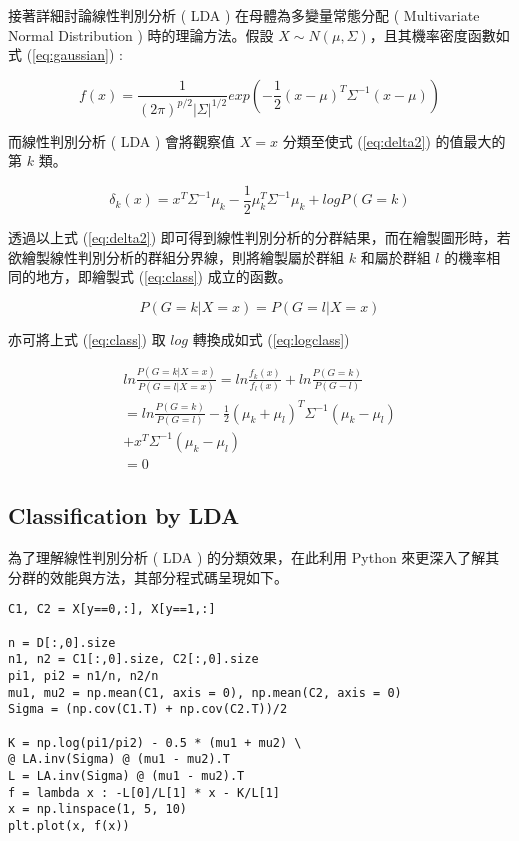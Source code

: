 接著詳細討論線性判別分析 ( LDA ) 在母體為多變量常態分配 ( Multivariate Normal Distribution ) 時的理論方法。假設 $X \sim N(\mu, \Sigma)$，且其機率密度函數如式 (\ref{eq:gaussian}) :

\begin{equation}\label{eq:gaussian}
f(x)=\frac{1}{(2\pi)^{p/2}\left|\Sigma\right|^{1/2}}exp(-\frac{1}{2}(x-\mu)^{T}\Sigma^{-1}(x-\mu))
\end{equation}

而線性判別分析 ( LDA ) 會將觀察值 $X=x$ 分類至使式 (\ref{eq:delta2}) 的值最大的第 $k$ 類。

\begin{equation}\label{eq:delta2}
\delta_k(x)=x^{T}\Sigma^{-1}\mu_k-\frac{1}{2}\mu_k^{T}\Sigma^{-1}\mu_k+log P(G=k)
\end{equation}

透過以上式 (\ref{eq:delta2}) 即可得到線性判別分析的分群結果，而在繪製圖形時，若欲繪製線性判別分析的群組分界線，則將繪製屬於群組 $k$ 和屬於群組 $l$ 的機率相同的地方，即繪製式 (\ref{eq:class}) 成立的函數。

\begin{equation}\label{eq:class}
P(G=k|X=x)=P(G=l|X=x)
\end{equation}

亦可將上式 (\ref{eq:class}) 取 $log$ 轉換成如式 (\ref{eq:logclass})

\begin{equation}\label{eq:logclass}
\begin{split}
ln \frac{P(G=k|X=x)}{P(G=l|X=x)}=ln \frac{f_k(x)}{f_l(x)}+ln \frac{P(G=k)}{P(G-l)}\\
=ln \frac{P(G=k)}{P(G=l)}-\frac{1}{2}(\mu_k+\mu_l)^{T} \Sigma^{-1} (\mu_k-\mu_l)\\
+x^{T} \Sigma^{-1} (\mu_k-\mu_l)\\
=0
\end{split}
\end{equation}

\subsection{Classification by LDA}

為了理解線性判別分析 ( LDA ) 的分類效果，在此利用 Python 來更深入了解其分群的效能與方法，其部分程式碼呈現如下。

\bigskip
\begin{lstlisting}
C1, C2 = X[y==0,:], X[y==1,:]

n = D[:,0].size
n1, n2 = C1[:,0].size, C2[:,0].size
pi1, pi2 = n1/n, n2/n
mu1, mu2 = np.mean(C1, axis = 0), np.mean(C2, axis = 0)
Sigma = (np.cov(C1.T) + np.cov(C2.T))/2

K = np.log(pi1/pi2) - 0.5 * (mu1 + mu2) \
@ LA.inv(Sigma) @ (mu1 - mu2).T
L = LA.inv(Sigma) @ (mu1 - mu2).T
f = lambda x : -L[0]/L[1] * x - K/L[1]
x = np.linspace(1, 5, 10)
plt.plot(x, f(x))
\end{lstlisting}

